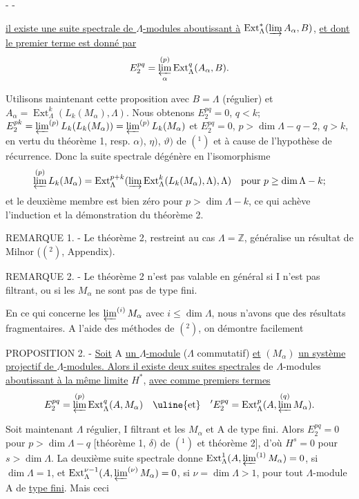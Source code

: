 -  -

\uline{il existe une suite spectrale de $\Lambda$-modules aboutissant à}
$\operatorname{Ext}_{\Lambda}^{*}(\varinjlim A_{\alpha},B)$, \uline{et dont le premier terme est donné par}
\[
E_2^{pq}=\varprojlim_{\alpha}^{(p)}\operatorname{Ext}_{\Lambda}^{q}(A_{\alpha},B).
\]

Utilisons maintenant cette proposition avec $B=\Lambda$ (régulier) et $A_{\alpha}=\operatorname{Ext}_{\Lambda}^{k}(L_k(M_{\alpha}),\Lambda)$. Nous obtenons $E_2^{pq}=0$, $q<k$;
$E_2^{pk}=\varprojlim^{(p)}L_k(L_k(M_{\alpha}))=\varprojlim^{(p)}L_k(M_{\alpha})$ et $E_2^{pq}=0$, $p>\dim\Lambda-q-2$, $q>k$, en vertu du théorème 1, resp. $\alpha)$, $\eta)$, $\vartheta)$ de $(^{1})$ et à cause de l'hypothèse de récurrence. Donc la suite spectrale dégénère en l'isomorphisme
\[
\varprojlim^{(p)}L_k(M_{\alpha})=\operatorname{Ext}_{\Lambda}^{p+k}(\varinjlim\operatorname{Ext}_{\Lambda}^{k}(L_k(M_{\alpha}),\Lambda),\Lambda)\quad\text{pour }p\geq\dim\Lambda-k;
\]
et le  deuxième membre est bien zéro pour $p>\dim\Lambda-k$, ce qui achève l'induction et la démonstration du théorème 2.

REMARQUE 1. - Le théorème 2, restreint au cas $\Lambda=\mathbb Z$, généralise un résultat de Milnor ($(^{2})$, Appendix).

REMARQUE 2. - Le théorème 2 n'est pas valable en général si I n'est pas filtrant, ou si les $M_{\alpha}$ ne sont pas de type fini.

En ce qui concerne les $\varprojlim^{(i)}M_{\alpha}$ avec $i\leq\dim\Lambda$, nous n'avons que des résultats fragmentaires. A l'aide des méthodes de $(^{2})$, on démontre facilement

PROPOSITION 2. - \uline{Soit} A \uline{un $\Lambda$-module} ($\Lambda$ commutatif) \uline{et} $(M_{\alpha})$ \uline{un système projectif de $\Lambda$-modules. Alors il existe deux suites spectrales} de $\Lambda$-modules \uline{aboutissant à la même limite} $H^{*}$, \uline{avec comme premiers termes}
\[
E_2^{pq}=\varprojlim^{(p)}\operatorname{Ext}_{\Lambda}^{q}(A,M_{\alpha})\quad\uline{\text{et}}\quad {}'E_2^{pq}=\operatorname{Ext}_{\Lambda}^{p}(A,\varprojlim^{(q)}M_{\alpha}).
\]

Soit maintenant $\Lambda$ régulier, I filtrant et les $M_{\alpha}$ et A de type fini. Alors $E_2^{pq}=0$ pour $p>\dim\Lambda-q$ [théorème 1, $\delta)$ de $(^{1})$ et théorème 2], d'où $H^s=0$ pour $s>\dim\Lambda$. La deuxième suite spectrale donne $\operatorname{Ext}_{\Lambda}^{1}(A,\varprojlim^{(1)}M_{\alpha})=0$, si $\dim\Lambda=1$, et $\operatorname{Ext}_{\Lambda}^{\nu-1}(A,\varprojlim^{(\nu)}M_{\alpha})=0$, si $\nu=\dim\Lambda>1$, pour tout $\Lambda$-module A de \uline{type fini}. Mais ceci
